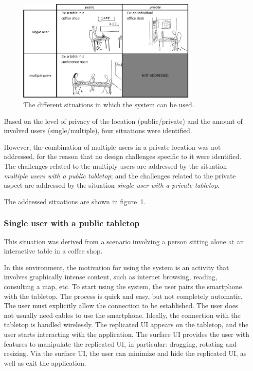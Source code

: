 \begin{figure}[htb]
  \centering
    \includegraphics[width=0.8\textwidth]{images/marietable}
    \caption{The different situations in which the system can be used.}
    \label{fig:scenarios}
\end{figure}

Based on the level of privacy of the location (public/private) and the amount of involved users (single/multiple), four situations were identified.

However, the combination of multiple users in a private location was not addressed, for the reason that no design challenges specific to it were identified.
The challenges related to the multiply users are addressed by the situation \emph{multiple users with a public tabletop}; and the challenges related to the private aspect are addressed by the situation \emph{single user with a private tabletop}. 

The addressed situations are shown in figure~\ref{fig:scenarios}.

\subsubsection{Single user with a public tabletop}

This situation was derived from a scenario involving a person sitting alone at an interactive table in a coffee shop.

In this environment, the motivation for using the system is an activity that involves graphically intense content, such as 
internet browsing, reading, consulting a map, etc.
To start using the system, the user pairs the smartphone with the tabletop.
The process is quick and easy, but not completely automatic.
The user must explicitly allow the connection to be established.
The user does not usually need cables to use the smartphone.
Ideally, the connection with the tabletop is handled wirelessly.
The replicated UI appears on the tabletop, and the user starts interacting with the application.
The surface UI provides the user with features to manipulate the replicated UI, in particular: dragging, rotating and resizing.
Via the surface UI, the user can minimize and hide the replicated UI, as well as exit the application.

